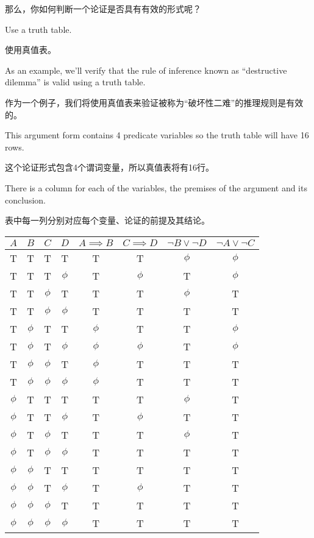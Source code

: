 那么，你如何判断一个论证是否具有有效的形式呢？

Use a truth table.

使用真值表。

As an example, we'll verify that the rule of inference known as 
``destructive dilemma'' 
is valid using a truth table.

作为一个例子，我们将使用真值表来验证被称为“破坏性二难”的推理规则是有效的。

This argument
form contains 4 predicate variables so the truth table will have 16 rows.

这个论证形式包含4个谓词变量，所以真值表将有16行。

There is a column for each of the variables, the premises of the argument
and its conclusion.

表中每一列分别对应每个变量、论证的前提及其结论。

\begin{center}
\begin{tabular}{cccc|c|c|c|c|}
$A$   & $B$   & $C$   & $D$   & $A{\implies}B$ & $C{\implies}D$ & ${\lnot}B \lor {\lnot}D$ & ${\lnot}A \lor {\lnot}C$ \\ \hline
T     & T     & T     & T     & T     & T     & $\phi$ & $\phi$ \\
T     & T     & T     & $\phi$ & T     & $\phi$ & T     & $\phi$ \\
T     & T     & $\phi$ & T     & T     & T     & $\phi$ & T     \\
T     & T     & $\phi$ & $\phi$ & T     & T     & T     & T     \\
T     & $\phi$ & T     & T     & $\phi$ & T     & T     & $\phi$ \\
T     & $\phi$ & T     & $\phi$ & $\phi$ & $\phi$ & T     & $\phi$ \\
T     & $\phi$ & $\phi$ & T     & $\phi$ & T     & T     & T     \\
T     & $\phi$ & $\phi$ & $\phi$ & $\phi$ & T     & T     & T     \\ 
$\phi$ & T     & T     & T     & T     & T     & $\phi$ & T     \\
$\phi$ & T     & T     & $\phi$ & T     & $\phi$ & T     & T     \\
$\phi$ & T     & $\phi$ & T     & T     & T     & $\phi$ & T     \\
$\phi$ & T     & $\phi$ & $\phi$ & T     & T     & T     & T     \\
$\phi$ & $\phi$ & T     & T     & T     & T     & T     & T     \\
$\phi$ & $\phi$ & T     & $\phi$ & T     & $\phi$ & T     & T     \\
$\phi$ & $\phi$ & $\phi$ & T     & T     & T     & T     & T     \\
$\phi$ & $\phi$ & $\phi$ & $\phi$ & T     & T     & T     & T     \\
\end{tabular}
\end{center}

